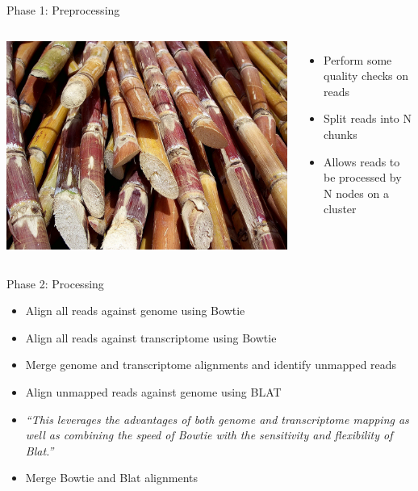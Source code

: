\documentclass{beamer}
\begin{document}
\begin{frame}{Phase 1: Preprocessing}

  \begin{columns}
    \column{2in}
    \includegraphics[scale=0.06]{Cut_sugarcane.jpg}
    \column{3in}
  \begin{itemize}
  \item Perform some quality checks on reads
  \item Split reads into N chunks
  \item Allows reads to be processed by N nodes on a cluster
  \end{itemize}

  \end{columns}
\end{frame}

\begin{frame}{Phase 2: Processing}

\begin{itemize}
  \item Align all reads against genome using Bowtie
  \item Align all reads against transcriptome using Bowtie
  \item Merge genome and transcriptome alignments and identify unmapped reads
  \item Align unmapped reads against genome using BLAT

  \item \textit{``This leverages the advantages of both genome and transcriptome mapping as well as combining the speed of Bowtie with the sensitivity and flexibility of Blat.''}

  \item Merge Bowtie and Blat alignments
\end{itemize}
\end{frame}
\end{document}
